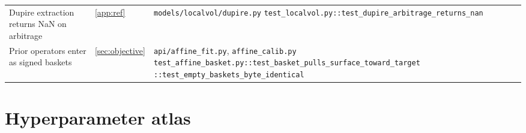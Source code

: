 \documentclass[11pt]{article}
\begin{document}
\begin{longtable}{@{}p{}p{}p{}@{}}
\addlinespace
Dupire extraction returns NaN on arbitrage &
\cref{app:ref} &
\nolinkurl{models/localvol/dupire.py}\newline
\nolinkurl{test_localvol.py::test_dupire_arbitrage_returns_nan}\\
\addlinespace
Prior operators enter as signed baskets &
\cref{sec:objective} &
\nolinkurl{api/affine_fit.py}, \nolinkurl{affine_calib.py}\newline
\nolinkurl{test_affine_basket.py::test_basket_pulls_surface_toward_target}\newline
\nolinkurl{::test_empty_baskets_byte_identical}\\
\bottomrule
\end{longtable}
\endgroup

\appendix
\section{Hyperparameter atlas}
\label{app:atlas}
\end{document}
